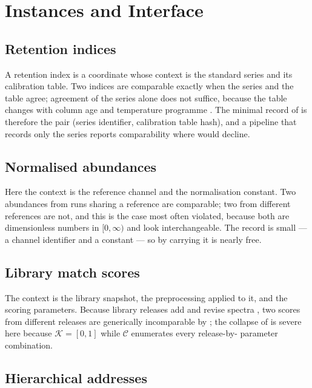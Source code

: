\documentclass[11pt,a4paper]{article}
\theoremstyle{definition}
\theoremstyle{remark}
\newcommand{\Crd}{\mathcal{K}}               %
\newcommand{\Ctx}{\mathcal{C}}               %
\begin{document}
\section{Instances and Interface}
\label{sec:practice}

\subsection{Retention indices}

A retention index is a coordinate whose context is the standard series
and its calibration table. Two indices are comparable exactly when the
series and the table agree; agreement of the series alone does not
suffice, because the table changes with column age and temperature
programme \citep{vandendool1963generalization}. The minimal record of
 is therefore the pair (series identifier,
calibration table hash), and a pipeline that records only the series
reports comparability where  would decline.

\subsection{Normalised abundances}

Here the context is the reference channel and the normalisation constant.
Two abundances from runs sharing a reference are comparable; two from
different references are not, and this is the case most often violated,
because both are dimensionless numbers in $[0,\infty)$ and look
interchangeable. The record is small --- a channel identifier and a
constant --- so by  carrying it is nearly free.

\subsection{Library match scores}

The context is the library snapshot, the preprocessing applied to it, and
the scoring parameters. Because library releases add and revise spectra
\citep{stein1994optimization,horai2010massbank}, two scores from
different releases are generically incomparable by
; the collapse of  is severe
here because $\Crd = [0,1]$ while $\Ctx$ enumerates every release-by-
parameter combination.

\subsection{Hierarchical addresses}
\end{document}
